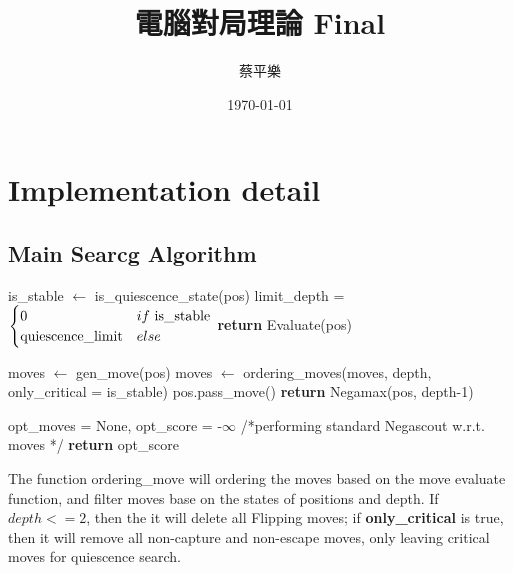 \documentclass[a4paper, 12pt]{article}  %
\title{電腦對局理論 Final}
\author{蔡平樂}
\date{\today}
\begin{document}
\vspace{-2em}
\maketitle
\vspace{-3em}


\section{Implementation detail}

\subsection{Main Searcg Algorithm}

\begin{algorithm}[!h]
  \begin{algorithmic}
    \State is\_stable $\gets$ is\_quiescence\_state(pos)
    \State limit\_depth = $\rm \begin{cases}\rm0&if\ \rm is\_stable\\ \rm quiescence\_limit& else\end{cases}$
        \State \textbf{return} Evaluate(pos)
    \EndIf
    
    \State moves $\gets$ gen\_move(pos)
    \State moves $\gets$ ordering\_moves(moves, depth, only\_critical = is\_stable)
      \State pos.pass\_move()
      \State \textbf{return} Negamax(pos, depth-1)
    \EndIf
    
    \State opt\_moves = None, opt\_score = -$\infty$
    \State /*performing standard Negascout w.r.t. moves */%
    \State \textbf{return} opt\_score
    \EndProcedure
  \end{algorithmic}
\end{algorithm}

The function ordering\_move will ordering the moves based on the move evaluate function, and filter moves base on the states of positions and depth. If $depth <= 2$, then the it will delete all Flipping moves; if \textbf{only\_critical} is true, then it will remove all non-capture and non-escape moves, only leaving critical moves for quiescence search.
\end{document}
